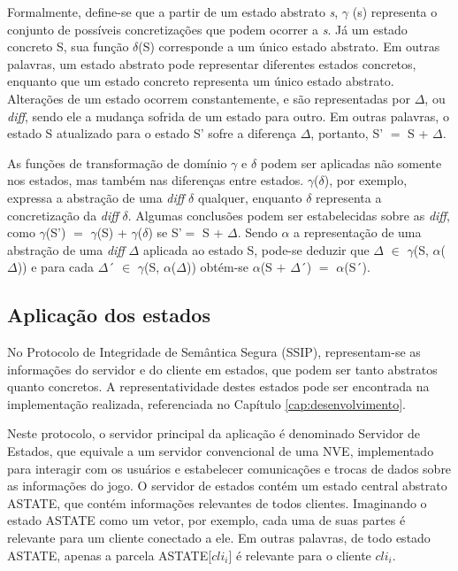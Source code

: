 Formalmente, define-se que a partir de um estado abstrato \textit{s}, $\gamma$ (s) representa o conjunto de possíveis concretizações que podem ocorrer a \textit{s}. Já um estado concreto S, sua função $\delta$(S) corresponde a um único estado abstrato. Em outras palavras, um estado abstrato pode representar diferentes estados concretos, enquanto que um estado concreto representa um único estado abstrato. Alterações de um estado ocorrem constantemente, e são representadas por $\Delta$, ou \textit{diff}, sendo ele a mudança sofrida de um estado para outro. Em outras palavras, o estado S atualizado para o estado S' sofre a diferença $\Delta$, portanto, S' $=$ S + $\Delta$. 

As funções de transformação de domínio $\gamma$ e $\delta$ podem ser aplicadas não somente nos estados, mas também nas diferenças entre estados. $\gamma$($\delta$), por exemplo, expressa a abstração de uma \textit{diff} $\delta$ qualquer, enquanto $\delta$ representa a concretização da \textit{diff} $\delta$. Algumas conclusões podem ser estabelecidas sobre as \textit{diff}, como $\gamma$(S') $=$ $\gamma$(S) + $\gamma$($\delta$) se S'$=$ S + $\Delta$. Sendo $\alpha$ a representação de uma abstração de uma \textit{diff} $\Delta$ aplicada ao estado S, pode-se deduzir que $\Delta$ $\in$ $\gamma$(S, $\alpha$($\Delta$)) e para cada $\Delta$´ $\in$ $\gamma$(S, $\alpha$($\Delta$)) obtém-se $\alpha$(S $+$ $\Delta$´) $=$ $\alpha$(S´).


\subsection{Aplicação dos estados}

No Protocolo de Integridade de Semântica Segura (SSIP), representam-se as informações do servidor e do cliente em estados, que podem ser tanto abstratos quanto concretos. A representatividade destes estados pode ser encontrada na implementação realizada, referenciada no Capítulo \ref{cap:desenvolvimento}. 

Neste protocolo, o servidor principal da aplicação é denominado Servidor de Estados, que equivale a um servidor convencional de uma NVE, implementado para interagir com os usuários e estabelecer comunicações e trocas de dados sobre as informações do jogo. O servidor de estados contém um estado central abstrato ASTATE, que contém informações relevantes de todos clientes. Imaginando o estado ASTATE como um vetor, por exemplo, cada uma de suas partes é relevante para um cliente conectado a ele. Em outras palavras, de todo estado ASTATE, apenas a parcela ASTATE[$cli_i$] é relevante para o cliente $cli_i$.

